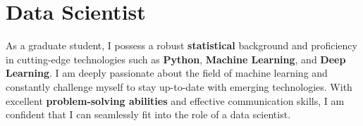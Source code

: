 
\section{Data Scientist}
\small{
    As a graduate student, I possess a robust \textbf{statistical} background and proficiency in cutting-edge technologies such as \textbf{Python}, \textbf{Machine Learning}, and \textbf{Deep Learning}. I am deeply passionate about the field of machine learning and constantly challenge myself to stay up-to-date with emerging technologies. With excellent \textbf{problem-solving abilities} and effective communication skills, I am confident that I can seamlessly fit into the role of a data scientist.
}